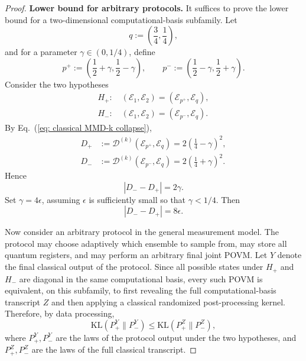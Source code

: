 \documentclass[aps,prx,reprint,superscriptaddress,amsmath,amssymb,longbibliography,floatfix]{revtex4-2}
\newcommand{\scD}{\mathcal{D}}
\newcommand{\scE}{\mathcal{E}}
\theoremstyle{plain}
\theoremstyle{definition}
\theoremstyle{remark}
\begin{document}
\begin{proof}
\medskip

\textbf{Lower bound for arbitrary protocols.}
It suffices to prove the lower bound for a two-dimensional computational-basis subfamily. Let
\[
    q
    :=
    \left(\frac34,\frac14\right),
\]
and for a parameter \(\gamma\in(0,1/4)\), define
\begin{equation}
    p^+
    :=
    \left(\frac12+\gamma,\frac12-\gamma\right),
    \qquad
    p^-
    :=
    \left(\frac12-\gamma,\frac12+\gamma\right).
\label{eq:app-classical-hard-probabilities}
\end{equation}
Consider the two hypotheses
\[
\begin{gathered}
H_+:\quad
    (\scE_1,\scE_2)=(\scE_{p^+},\scE_q),
    \\
    H_-:\quad
    (\scE_1,\scE_2)=(\scE_{p^-},\scE_q).
\end{gathered}
\]
By Eq.~(\ref{eq: classical MMD-k collapse}),
\begin{align}
    D_+
    &:=
    \scD^{(k)}(\scE_{p^+},\scE_q)
    =
    2\left(\frac14-\gamma\right)^2,\\
    D_-
    &:=
    \scD^{(k)}(\scE_{p^-},\scE_q)
    =
    2\left(\frac14+\gamma\right)^2.
\end{align}
Hence
\begin{equation}
    |D_- - D_+|
    =
    2\gamma .
    \label{eq: classical hard gap}
\end{equation}
Set \(\gamma=4\epsilon\), assuming \(\epsilon\) is sufficiently small so that \(\gamma<1/4\). Then
\[
    |D_- - D_+|=8\epsilon .
\]

Now consider an arbitrary protocol in the general measurement model. The protocol may choose adaptively which ensemble to sample from, may store all quantum registers, and may perform an arbitrary final joint POVM. Let \(Y\) denote the final classical output of the protocol. Since all possible states under \(H_+\) and \(H_-\) are diagonal in the same computational basis, every such POVM is equivalent, on this subfamily, to first revealing the full computational-basis transcript \(Z\) and then applying a classical randomized post-processing kernel. Therefore, by data processing,
\begin{equation}
    \mathrm{KL}(P_+^Y\|P_-^Y)
    \le
    \mathrm{KL}(P_+^Z\|P_-^Z),
\end{equation}
where \(P_+^Y,P_-^Y\) are the laws of the protocol output under the two hypotheses, and \(P_+^Z,P_-^Z\) are the laws of the full classical transcript.


\end{proof}
\end{document}
